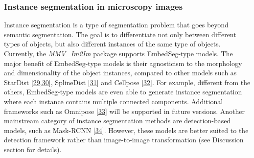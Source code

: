 \hypertarget{instance-segmentation-in-microscopy-images}{%
\subsubsection{Instance segmentation in microscopy images}\label{instance-segmentation-in-microscopy-images}}

Instance segmentation is a type of segmentation problem that goes beyond semantic segmentation. The goal is to differentiate not only between different types of objects, but also different instances of the same type of objects. Currently, the \emph{MMV\_Im2Im} package supports EmbedSeg-type models. The major benefit of EmbedSeg-type models is their agnosticism to the morphology and dimensionality of the object instances, compared to other models such as StarDist {[}\protect\hyperlink{ref-tIIG2f8K}{29},\protect\hyperlink{ref-14h90Vfg0}{30}{]}, SplineDist {[}\protect\hyperlink{ref-17Yrl6WGQ}{31}{]} and Cellpose {[}\protect\hyperlink{ref-TugPkOLy}{32}{]}. For example, different from the others, EmbedSeg-type models are even able to generate instance segmentation where each instance contains multiple connected components. Additional frameworks such as Omnipose {[}\protect\hyperlink{ref-lXzmjM5n}{33}{]} will be supported in future versions. Another mainstream category of instance segmentation methods are detection-based models, such as Mask-RCNN {[}\protect\hyperlink{ref-xi8wnibR}{34}{]}. However, these models are better suited to the detection framework rather than image-to-image transformation (see Discussion section for details).

